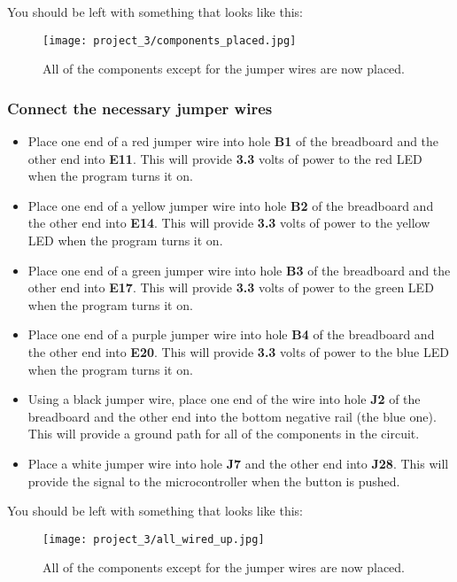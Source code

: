 You should be left with something that looks like this:
\begin{figure}[H]
    \centering
    \texttt{[image: project\_3/components\_placed.jpg]}
    \caption{All of the components except for the jumper wires are now placed.}
\end{figure}

\subsubsection{Connect the necessary jumper wires}
\begin{itemize}
    \item Place one end of a red jumper wire into hole \textbf{B1} of the breadboard and the other end into
    \textbf{E11}. This will provide \textbf{3.3} volts of power to the red LED when the program turns it on.
    \item Place one end of a yellow jumper wire into hole \textbf{B2} of the breadboard and the other end into
    \textbf{E14}. This will provide \textbf{3.3} volts of power to the yellow LED when the program turns it on.
    \item Place one end of a green jumper wire into hole \textbf{B3} of the breadboard and the other end into
    \textbf{E17}. This will provide \textbf{3.3} volts of power to the green LED when the program turns it on.
    \item Place one end of a purple jumper wire into hole \textbf{B4} of the breadboard and the other end into
    \textbf{E20}. This will provide \textbf{3.3} volts of power to the blue LED when the program turns it on.
    \item Using a black jumper wire, place one end of the wire into hole \textbf{J2} of the breadboard and the other
    end into the bottom negative rail (the blue one). This will provide a ground path for all of the components
    in the circuit.
    \item Place a white jumper wire into hole \textbf{J7} and the other end into \textbf{J28}. This will
    provide the signal to the microcontroller when the button is pushed.
\end{itemize}

You should be left with something that looks like this:
\begin{figure}[H]
    \centering
    \texttt{[image: project\_3/all\_wired\_up.jpg]}
    \caption{All of the components except for the jumper wires are now placed.}
\end{figure}

